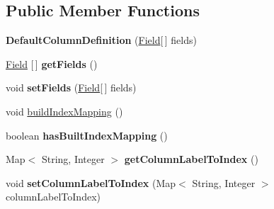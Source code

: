 \subsection*{Public Member Functions}
\begin{DoxyCompactItemize}
\item 
\mbox{\label{classcom_1_1mysql_1_1cj_1_1result_1_1_default_column_definition_a9cc411410985491d530f3310c15b0460}} 
{\bfseries Default\+Column\+Definition} (\mbox{\hyperlink{classcom_1_1mysql_1_1cj_1_1result_1_1_field}{Field}}\mbox{[}$\,$\mbox{]} fields)
\item 
\mbox{\label{classcom_1_1mysql_1_1cj_1_1result_1_1_default_column_definition_aef87110125ef18eea7f51f4c2d22b03a}} 
\mbox{\hyperlink{classcom_1_1mysql_1_1cj_1_1result_1_1_field}{Field}} \mbox{[}$\,$\mbox{]} {\bfseries get\+Fields} ()
\item 
\mbox{\label{classcom_1_1mysql_1_1cj_1_1result_1_1_default_column_definition_af37a2815b566bd95c2109c7649adf6f7}} 
void {\bfseries set\+Fields} (\mbox{\hyperlink{classcom_1_1mysql_1_1cj_1_1result_1_1_field}{Field}}\mbox{[}$\,$\mbox{]} fields)
\item 
void \mbox{\hyperlink{classcom_1_1mysql_1_1cj_1_1result_1_1_default_column_definition_a765750a709687a3a53d1fe1fa9891c96}{build\+Index\+Mapping}} ()
\item 
\mbox{\label{classcom_1_1mysql_1_1cj_1_1result_1_1_default_column_definition_a0eefd044779756c0945361b5a0627a7b}} 
boolean {\bfseries has\+Built\+Index\+Mapping} ()
\item 
\mbox{\label{classcom_1_1mysql_1_1cj_1_1result_1_1_default_column_definition_a625450cf994980769ce878b7e8ede9b3}} 
Map$<$ String, Integer $>$ {\bfseries get\+Column\+Label\+To\+Index} ()
\item 
\mbox{\label{classcom_1_1mysql_1_1cj_1_1result_1_1_default_column_definition_acf4c5671472b2d95e2ca7e8600a58999}} 
void {\bfseries set\+Column\+Label\+To\+Index} (Map$<$ String, Integer $>$ column\+Label\+To\+Index)

\end{DoxyCompactItemize}
